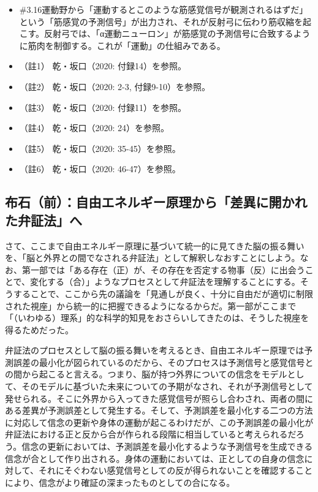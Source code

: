 \begin{note}{}
  \begin{itemize}
    \tightlist
    \item{\#3.16}運動野から「運動するとこのような筋感覚信号が観測されるはずだ」という「筋感覚の予測信号」が出力され、それが反射弓に伝わり筋収縮を起こす。反射弓では、「α運動ニューロン」が筋感覚の予測信号に合致するように筋肉を制御する。これが「運動」の仕組みである。
  \end{itemize}
\end{note}

\begin{itemize}
\tightlist
\item
  （註1） 乾・坂口（2020: 付録14）\cite{InuiAndSakaguchi}を参照。
\item
  （註2） 乾・坂口（2020: 2-3, 付録9-10）\cite{InuiAndSakaguchi}を参照。
\item
  （註3） 乾・坂口（2020: 付録11）\cite{InuiAndSakaguchi}を参照。
\item
  （註4） 乾・坂口（2020: 24）\cite{InuiAndSakaguchi}を参照。
\item
  （註5） 乾・坂口（2020: 35-45）\cite{InuiAndSakaguchi}を参照。
\item
  （註6） 乾・坂口（2020: 46-47）\cite{InuiAndSakaguchi}を参照。
\end{itemize}

\subsection{布石（前）：自由エネルギー原理から「差異に開かれた弁証法」へ}\label{ux5e03ux77f3ux524dux81eaux7531ux30a8ux30cdux30ebux30aeux30fcux539fux7406ux304bux3089ux5deeux7570ux306bux958bux304bux308cux305fux5f01ux8a3cux6cd5ux3078}

さて、ここまで自由エネルギー原理に基づいて統一的に見てきた脳の振る舞いを、「脳と外界との間でなされる弁証法」として解釈しなおすことにしよう。なお、第一部では「ある存在（正）が、その存在を否定する物事（反）に出会うことで、変化する（合）」ようなプロセスとして弁証法を理解することにする。そうすることで、ここから先の議論を「見通しが良く、十分に自由だが適切に制限された視座」から統一的に把握できるようになるからだ。第一部がここまで「（いわゆる）理系」的な科学的知見をおさらいしてきたのは、そうした視座を得るためだった。

弁証法のプロセスとして脳の振る舞いを考えるとき、自由エネルギー原理では予測誤差の最小化が図られているのだから、そのプロセスは予測信号と感覚信号との間から起こると言える。つまり、脳が持つ外界についての信念をモデルとして、そのモデルに基づいた未来についての予期がなされ、それが予測信号として発せられる。そこに外界から入ってきた感覚信号が照らし合わされ、両者の間にある差異が予測誤差として発生する。そして、予測誤差を最小化する二つの方法に対応して信念の更新や身体の運動が起こるわけだが、この予測誤差の最小化が弁証法における正と反から合が作られる段階に相当していると考えられるだろう。信念の更新においては、予測誤差を最小化するような予測信号を生成できる信念が合として作り出される。身体の運動においては、正としての自身の信念に対して、それにそぐわない感覚信号としての反が得られないことを確認することにより、信念がより確証の深まったものとしての合になる。


